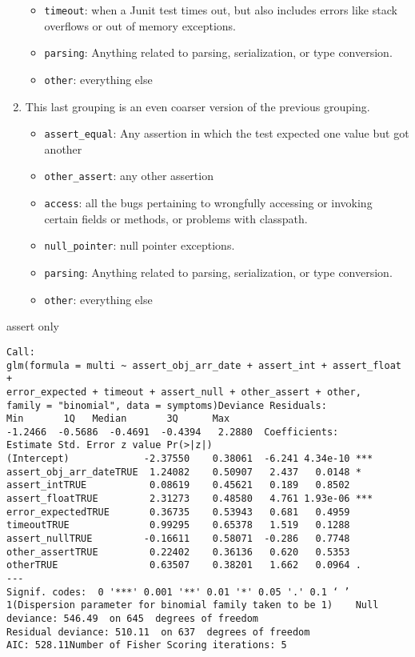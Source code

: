 \begin{enumerate}
\begin{itemize}
		\item \lstinline{timeout}: when a Junit test times out, but also includes errors like stack overflows or out of memory exceptions.
		\item \lstinline{parsing}: Anything related to parsing, serialization, or type conversion.
		\item \lstinline{other}: everything else
	\end{itemize}
	\item This last grouping is an even coarser version of the previous grouping.
	\begin{itemize}
		\item \lstinline{assert_equal}: Any assertion in which the test expected one value but got another
		\item \lstinline{other_assert}: any other assertion
		\item \lstinline{access}: all the bugs pertaining to wrongfully accessing or invoking certain fields or methods, or problems with classpath.
		\item \lstinline{null_pointer}: null pointer exceptions.
		\item \lstinline{parsing}: Anything related to parsing, serialization, or type conversion.
		\item \lstinline{other}: everything else
	\end{itemize}
\end{enumerate}


assert only
\begin{lstlisting}
Call:
glm(formula = multi ~ assert_obj_arr_date + assert_int + assert_float +
error_expected + timeout + assert_null + other_assert + other,
family = "binomial", data = symptoms)Deviance Residuals:
Min       1Q   Median       3Q      Max
-1.2466  -0.5686  -0.4691  -0.4394   2.2880  Coefficients:
Estimate Std. Error z value Pr(>|z|)
(Intercept)             -2.37550    0.38061  -6.241 4.34e-10 ***
assert_obj_arr_dateTRUE  1.24082    0.50907   2.437   0.0148 *
assert_intTRUE           0.08619    0.45621   0.189   0.8502
assert_floatTRUE         2.31273    0.48580   4.761 1.93e-06 ***
error_expectedTRUE       0.36735    0.53943   0.681   0.4959
timeoutTRUE              0.99295    0.65378   1.519   0.1288
assert_nullTRUE         -0.16611    0.58071  -0.286   0.7748
other_assertTRUE         0.22402    0.36136   0.620   0.5353
otherTRUE                0.63507    0.38201   1.662   0.0964 .
---
Signif. codes:  0 '***' 0.001 '**' 0.01 '*' 0.05 '.' 0.1 ‘ ’ 1(Dispersion parameter for binomial family taken to be 1)    Null deviance: 546.49  on 645  degrees of freedom
Residual deviance: 510.11  on 637  degrees of freedom
AIC: 528.11Number of Fisher Scoring iterations: 5
\end{lstlisting}

